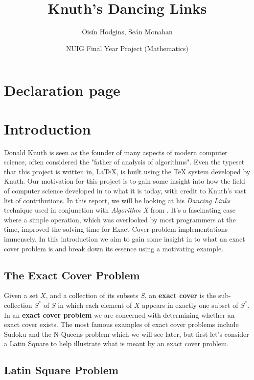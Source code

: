 \documentclass{article}
\title{Knuth's Dancing Links}
\author{Oisín Hodgins, Seán Monahan }
\date{NUIG Final Year Project (Mathematics)}
\begin{document}
\maketitle
\clearpage
\section{Declaration page}
\clearpage
\section{Introduction}
Donald Knuth is seen as the founder of many aspects of modern computer science, often considered the "father of analysis of algorithms". Even the typeset that this project is written in, \LaTeX, is built using the \TeX{} system developed by Knuth. Our motivation for this project is to gain some insight into how the field of computer science developed in to what it is today, with credit to Knuth's vast list of  contributions. In this report, we will be looking at his \textit{Dancing Links} technique used in conjunction with \textit{Algorithm X} from \cite{dlx}. It's a fascinating case where a simple operation, which was overlooked by most programmers at the time, improved the solving time for Exact Cover problem implementations immensely. In this introduction we aim to gain some insight in to what an exact cover problem is and break down its essence using a motivating example.

\subsection{The Exact Cover Problem}
Given a set $X$, and a collection of its subsets $S$, an \textbf{exact cover} is the sub-collection $S^*$ of $S$ in which each element of ${X}$ appears in exactly one subset of $S^*$. In an \textbf{exact cover problem} we are concerned with determining whether an exact cover exists. The most famous examples of exact cover problems include Sudoku and the N-Queens problem which we will see later, but first let's consider a Latin Square to help illustrate what is meant by an exact cover problem.\\ 
\subsection{Latin Square Problem}
\end{document}
